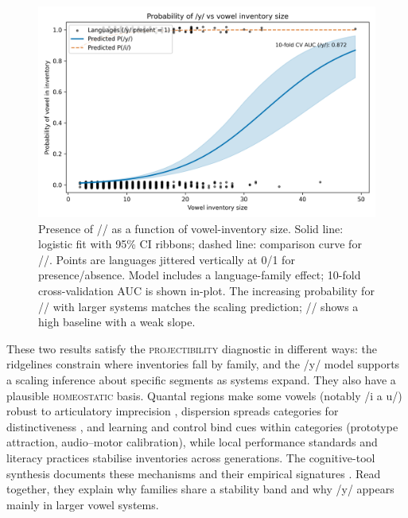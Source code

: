 \documentclass[12pt]{article}
\begin{document}
\begin{figure}[t]
  \centering
  \includegraphics[width=\linewidth]{images/y_vs_vowel_inventory.png}
  \caption{Presence of // as a function of vowel-inventory size.
  Solid line: logistic fit with 95\% CI ribbons; dashed line: comparison curve for //.
  Points are languages jittered vertically at 0/1 for presence/absence.
  Model includes a language-family effect; 10-fold cross-validation AUC is shown in-plot.
  The increasing probability for // with larger systems matches the scaling prediction; // shows a high baseline with a weak slope.}
  \label{fig:y-scaling}
\end{figure}

These two results satisfy the \textsc{projectibility} diagnostic in different ways: the ridgelines constrain where inventories fall by family, and the /y/ model supports a scaling inference about specific segments as systems expand. They also have a plausible \textsc{homeostatic} basis. Quantal regions make some vowels (notably /i a u/) robust to articulatory imprecision \citep{Stevens1989Quantal}, dispersion spreads categories for distinctiveness \citep{LiljencrantsLindblom1972,Lindblom1990HandH}, and learning and control bind cues within categories (prototype attraction, audio–motor calibration), while local performance standards and literacy practices stabilise inventories across generations. The cognitive-tool synthesis documents these mechanisms and their empirical signatures \citep[Fig.\,1; Fig.\,2; Table~1]{Ekstrom2025PhonemeTool}. Read together, they explain why families share a stability band and why /y/ appears mainly in larger vowel systems.
\end{document}
